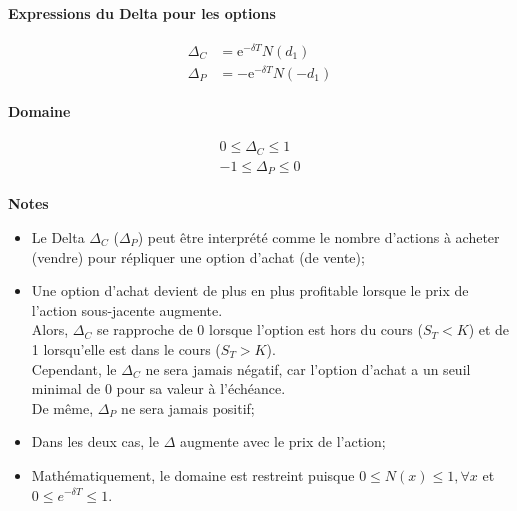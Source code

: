 \documentclass[10pt, french]{article}
\begin{document}
\begin{multicols*}{2}
\begin{definitionNOHFILL}[Delta $\Delta	=	\deriv{S}{V}$]
\begin{minipage}[ht]{0.5\linewidth}
\begin{center}
	\textbf{Expressions du Delta pour les options}
\end{center}
\begin{gather}
\begin{align*}
	\Delta_{C}
	&=	\textrm{e}^{-\delta T} N(d_{1})	\\
	\Delta_{P}
	&=	-\textrm{e}^{-\delta T} N(-d_{1})	
\end{align*}
\end{gather}
\end{minipage}
\begin{minipage}[ht]{0.5\linewidth}
\begin{center}
	\textbf{Domaine}
\end{center}
\begin{gather}
\begin{align*}
	0 \le \Delta_{C} \le 1	\\
	-1 \le \Delta_{P} \le 0	
\end{align*}
\end{gather}
\end{minipage}

\tcbline

\begin{center}
	\textbf{Notes}
\end{center}
\begin{itemize}[leftmargin = *]
	\item	Le Delta $\Delta_{C}$ ($\Delta_{P}$) peut être interprété comme le nombre d'actions à acheter (vendre) pour répliquer une option d'achat (de vente);
	\item	Une option d'achat devient de plus en plus profitable lorsque le prix de l'action sous-jacente augmente. \\
			Alors, $\Delta_{C}$ se rapproche de 0 lorsque l'option est hors du cours ($S_{T} < K$) et de 1 lorsqu'elle est dans le cours ($S_{T} > K$).\\
			Cependant, le $\Delta_{C}$ ne sera jamais négatif, car l'option d'achat a un seuil minimal de 0 pour sa valeur à l'échéance.\\
			De même, $\Delta_{P}$ ne sera jamais positif;
	\item	Dans les deux cas, le $\Delta$ augmente avec le prix de l'action;
	\item	Mathématiquement, le domaine est restreint puisque $0 \le N(x) \le 1, \forall x$ et $0 \le e^{-\delta T} \le 1$.
\end{itemize}
\end{definitionNOHFILL}


\end{multicols*}
\end{document}
